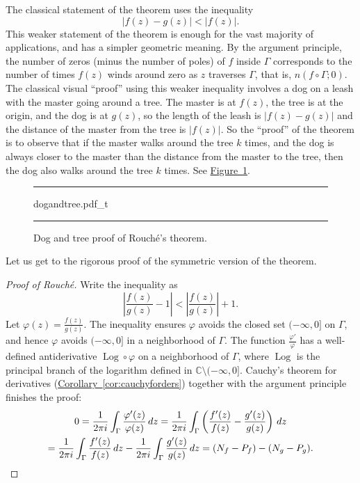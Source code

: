 \documentclass[12pt,openany]{book}
\newcommand{\Log}{\operatorname{Log}}
\newcommand{\sabs}[1]{\lvert {#1} \rvert}
\newcommand{\abs}[1]{\left\lvert {#1} \right\rvert}
\newcommand{\C}{{\mathbb{C}}}
\newcommand{\myquote}[1]{``#1''}
\theoremstyle{plain}
\theoremstyle{remark}
\theoremstyle{definition}
\newenvironment{myfig}{%
\begin{figure}[h!t]
\noindent\rule{\textwidth}{0.5pt}\vspace{12pt}\par\centering}%
{\par\noindent\rule{\textwidth}{0.5pt}
\end{figure}}
\theoremstyle{exercise}
\theoremstyle{example}
\newcommand{\figureref}[1]{\hyperref[#1]{Figure~\ref*{#1}}}
\newcommand{\corref}[1]{\hyperref[#1]{Corollary~\ref*{#1}}}
\begin{document}
The classical statement of the theorem uses the
inequality
\begin{equation*}
\sabs{f(z)-g(z)} < \sabs{f(z)} .
\end{equation*}
This weaker statement of the theorem is enough for the vast majority of
applications, and has a simpler geometric meaning.
By the argument principle, the number of zeros (minus the number of poles) of $f$
inside $\Gamma$ corresponds to the number of times $f(z)$ winds around zero
as $z$ traverses $\Gamma$, that is, $n(f \circ \Gamma;0)$.
The classical visual \myquote{proof} using this weaker
inequality involves a dog on a leash
with the master going around a tree.  The master is at $f(z)$, the tree is
at the origin, and the dog is at $g(z)$, so the length of the leash is
$\sabs{f(z)-g(z)}$ and the distance of the master from the tree is
$\sabs{f(z)}$.  So the \myquote{proof} of the theorem is to observe that if the
master walks around the tree $k$ times, and the dog is always closer to the
master than the distance from the master to the tree, then the dog also
walks
around the tree $k$ times.  See \figureref{fig:dogandtree}.

\begin{myfig}
{dogandtree.pdf_t}
\caption{Dog and tree proof of Rouch\'e's theorem.\label{fig:dogandtree}}
\end{myfig}

Let us get to the rigorous proof of the symmetric version of the
theorem.

\begin{proof}[Proof of Rouch\'e]
Write the inequality as
\begin{equation*}
\abs{\frac{f(z)}{g(z)} - 1} <
\abs{\frac{f(z)}{g(z)}} + 1 .
\end{equation*}
Let $\varphi(z) = \frac{f(z)}{g(z)}$.
The inequality ensures $\varphi$ avoids the closed set $(-\infty,0]$ on
$\Gamma$,
and hence $\varphi$ avoids $(-\infty,0]$ in a neighborhood of $\Gamma$.
The function
$\frac{\varphi'}{\varphi}$ has a well-defined antiderivative
$\Log \circ \varphi$ on a neighborhood of $\Gamma$, where $\Log$ is
the principal branch of the logarithm defined in $\C \setminus (-\infty,0]$.
Cauchy's theorem for derivatives (\corref{cor:cauchyforders})
together with the argument principle finishes the proof:
\begin{multline*}
0
= \frac{1}{2\pi i} \int_{\Gamma} \frac{\varphi'(z)}{\varphi(z)} \, dz
=
\frac{1}{2\pi i} \int_{\Gamma}
\left( \frac{f'(z)}{f(z)} - \frac{g'(z)}{g(z)} \right) \, dz 
\\
=
\frac{1}{2\pi i} \int_{\Gamma}
\frac{f'(z)}{f(z)} \, dz 
-
\frac{1}{2\pi i} \int_{\Gamma}
\frac{g'(z)}{g(z)} \, dz 
=
(N_f - P_f) - (N_g - P_g) .
\qedhere
\end{multline*}
\end{proof}
\end{document}
